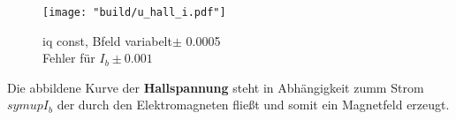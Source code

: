 \begin{figure}
   \centering
    \texttt{[image: "build/u\_hall\_i.pdf"]}
    \caption{iq const, Bfeld variabelt$\pm$ 0.0005\\Fehler für $I_b \pm 0.001$}
    \label{fig:Uhall}
 \end{figure}


Die abbildene Kurve der \textbf{Hallspannung} steht in Abhängigkeit zumm Strom $symup{I_b}$ der durch den Elektromagneten fließt und somit ein Magnetfeld erzeugt.








\newpage